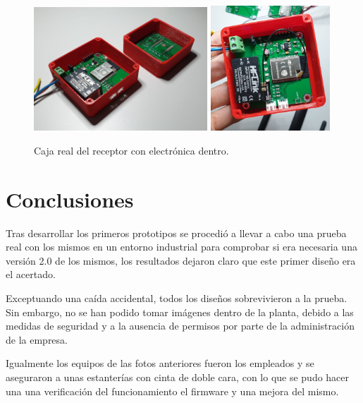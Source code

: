 \documentclass[paper=a4, fontsize=11pt,twoside]{scrartcl}
\begin{document}
        \paragraph{}
        \begin{center}
            \begin{figure}[h]
                \centering
                \includegraphics[width=0.58\textwidth]{../3d_master_2_box.jpeg}
                \includegraphics[width=0.4\textwidth]{../3d_antenna.jpeg}
                \caption{Caja real del receptor con electrónica dentro.}
                \label{fig:mesh1}
            \end{figure}    
        \end{center}
\section{Conclusiones}
    Tras desarrollar los primeros prototipos se procedió a llevar a cabo una prueba real con los mismos 
    en un entorno industrial para comprobar si era necesaria una versión 2.0 de los mismos, los resultados
    dejaron claro que este primer diseño era el acertado.

    Exceptuando una caída accidental, todos los diseños sobrevivieron a la prueba. Sin embargo, no se
    han podido tomar imágenes dentro de la planta, debido a las medidas de seguridad y a la ausencia
    de permisos por parte de la administración de la empresa.

    Igualmente los equipos de las fotos anteriores fueron los empleados y se aseguraron a unas estanterías con cinta de doble
    cara, con lo que se pudo hacer una una verificación del funcionamiento el firmware y una mejora del mismo.
\end{document}
